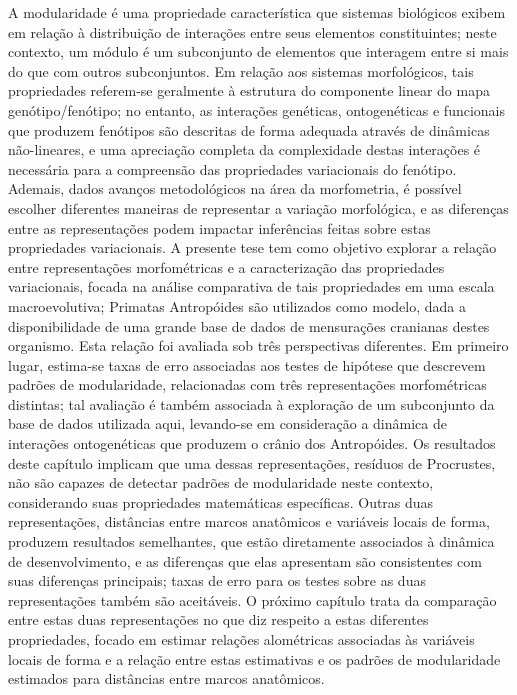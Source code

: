 A modularidade é uma propriedade característica que sistemas biológicos exibem em relação à distribuição de interações entre seus elementos constituintes; neste contexto, um módulo é um subconjunto de elementos que interagem entre si mais do que com outros subconjuntos.
Em relação aos sistemas morfológicos, tais propriedades referem-se geralmente à estrutura do componente linear do mapa genótipo/fenótipo; no entanto, as interações genéticas, ontogenéticas e funcionais que produzem fenótipos são descritas de forma adequada através de dinâmicas não-lineares, e uma apreciação completa da complexidade destas interações é necessária para a compreensão das propriedades variacionais do fenótipo.
Ademais, dados avanços metodológicos na área da morfometria, é possível escolher diferentes maneiras de representar a variação morfológica, e as diferenças entre as representações podem impactar inferências feitas sobre estas propriedades variacionais.
A presente tese tem como objetivo explorar a relação entre representações morfométricas e a caracterização das propriedades variacionais, focada na análise comparativa de tais propriedades em uma escala macroevolutiva; Primatas Antropóides são utilizados como modelo, dada a disponibilidade de uma grande base de dados de mensurações cranianas destes organismo.
Esta relação foi avaliada sob três perspectivas diferentes.
Em primeiro lugar, estima-se taxas de erro associadas aos testes de hipótese que descrevem padrões de modularidade, relacionadas com três representações morfométricas distintas; tal avaliação é também associada à exploração de um subconjunto da base de dados utilizada aqui, levando-se em consideração a dinâmica de interações ontogenéticas que produzem o crânio dos Antropóides.
Os resultados deste capítulo implicam que uma dessas representações, resíduos de Procrustes, não são capazes de detectar padrões de modularidade neste contexto, considerando suas propriedades matemáticas específicas.
Outras duas representações, distâncias entre marcos anatômicos e variáveis locais de forma, produzem resultados semelhantes, que estão diretamente associados à dinâmica de desenvolvimento, e as diferenças que elas apresentam são consistentes com suas diferenças principais; taxas de erro para os testes sobre as duas representações também são aceitáveis.
O próximo capítulo trata da comparação entre estas duas representações no que diz respeito a estas diferentes propriedades, focado em estimar relações alométricas associadas às variáveis locais de forma e a relação entre estas estimativas e os padrões de modularidade estimados para distâncias entre marcos anatômicos.
